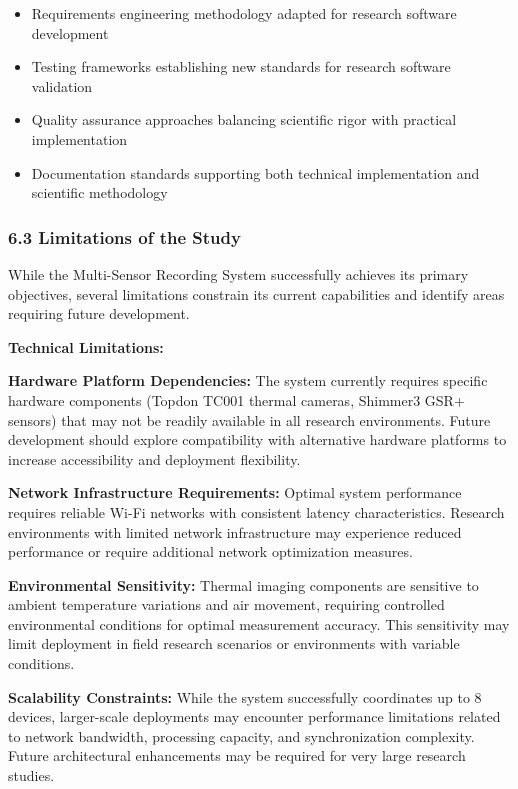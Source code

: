 \documentclass[12pt,a4paper]{report}
\begin{document}
\begin{itemize}
\item Requirements engineering methodology adapted for research software development
\item Testing frameworks establishing new standards for research software validation
\item Quality assurance approaches balancing scientific rigor with practical implementation
\item Documentation standards supporting both technical implementation and scientific methodology

\end{itemize}
\subsubsection{6.3 Limitations of the Study}

While the Multi-Sensor Recording System successfully achieves its primary objectives, several limitations constrain its
current capabilities and identify areas requiring future development.

\textbf{Technical Limitations:}

\textbf{Hardware Platform Dependencies:}
The system currently requires specific hardware components (Topdon TC001 thermal cameras, Shimmer3 GSR+ sensors) that
may not be readily available in all research environments. Future development should explore compatibility with
alternative hardware platforms to increase accessibility and deployment flexibility.

\textbf{Network Infrastructure Requirements:}
Optimal system performance requires reliable Wi-Fi networks with consistent latency characteristics. Research
environments with limited network infrastructure may experience reduced performance or require additional network
optimization measures.

\textbf{Environmental Sensitivity:}
Thermal imaging components are sensitive to ambient temperature variations and air movement, requiring controlled
environmental conditions for optimal measurement accuracy. This sensitivity may limit deployment in field research
scenarios or environments with variable conditions.

\textbf{Scalability Constraints:}
While the system successfully coordinates up to 8 devices, larger-scale deployments may encounter performance
limitations related to network bandwidth, processing capacity, and synchronization complexity. Future architectural
enhancements may be required for very large research studies.
\end{document}
